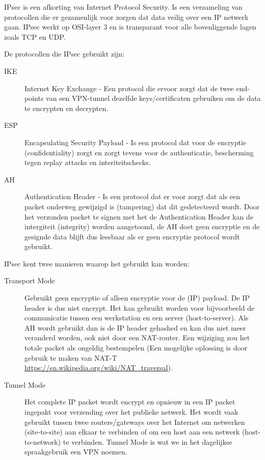 IPsec is een afkorting van Internet Protocol Security. Is een verzameling van protocollen die er gezamenlijk voor zorgen dat data veilig over een IP netwerk gaan. IPsec werkt op OSI-layer 3 en is transparant voor alle bovenliggende lagen zoals TCP en UDP.

De protocollen die IPsec gebruikt zijn:
\begin{description}
\item[IKE] Internet Key Exchange - Een protocol die ervoor zorgt dat de twee end-points van een VPN-tunnel dezelfde keys/certificaten gebruiken om de data te encrypten en decrypten.
\item[ESP] Encapsulating Security Payload - Is een protocol dat voor de encryptie (confidentiality) zorgt en zorgt tevens voor de authenticatie, bescherming tegen replay attacks en interiteitschecks.
\item[AH] Authentication Header - Is een protocol dat er voor zorgt dat als een packet onderweg gewijzigd is (tampering) dat dit gedetecteerd wordt. Door het verzonden packet te signen met het de Authentication Header kan de intergiteit (integrity) worden aangetoond, de AH doet geen encryptie en de gesignde data blijft dus leesbaar als er geen encryptie protocol wordt gebruikt.
\end{description}

IPsec kent twee manieren waarop het gebruikt kan worden:
\begin{description}
\item[Transport Mode] Gebruikt geen encryptie of alleen encryptie voor de (IP) payload. De IP header is dus niet encrypt. Het kan gebruikt worden voor bijvoorbeeld de communicatie tussen een werkstation en een server (host-to-server). Als AH wordt gebruikt dan is de IP header gehashed en kan dus niet meer veranderd worden, ook niet door een NAT-router. Een wijziging zou het totale packet als ongeldig bestempelen (Een mogelijke oplossing is door gebruik te maken van NAT-T \url{https://en.wikipedia.org/wiki/NAT_traversal}).

\item[Tunnel Mode] Het complete IP packet wordt encrypt en opnieuw in een IP packet ingepakt voor verzending over het publieke netwerk. Het wordt vaak gebruikt tussen twee routers/gateways over het Internet om netwerken (site-to-site) aan elkaar te verbinden of om een host aan een netwerk (host-to-network) te verbinden. Tunnel Mode is wat we in het dagelijkse spraakgebruik een VPN noemen.
\end{description}

